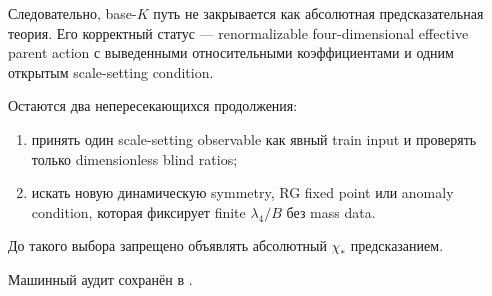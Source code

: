 Следовательно, base-\(K\) путь не закрывается как абсолютная
предсказательная теория. Его корректный статус --- renormalizable
four-dimensional effective parent action с выведенными относительными
коэффициентами и одним открытым scale-setting condition.

\begin{protocol}
Остаются два непересекающихся продолжения:
\begin{enumerate}
 \item принять один scale-setting observable как явный train input и
 проверять только dimensionless blind ratios;
 \item искать новую динамическую symmetry, RG fixed point или anomaly
 condition, которая фиксирует finite \(\lambda_4/B\) без mass data.
\end{enumerate}
До такого выбора запрещено объявлять абсолютный \(\chi_*\) предсказанием.
\end{protocol}

Машинный аудит сохранён в
.